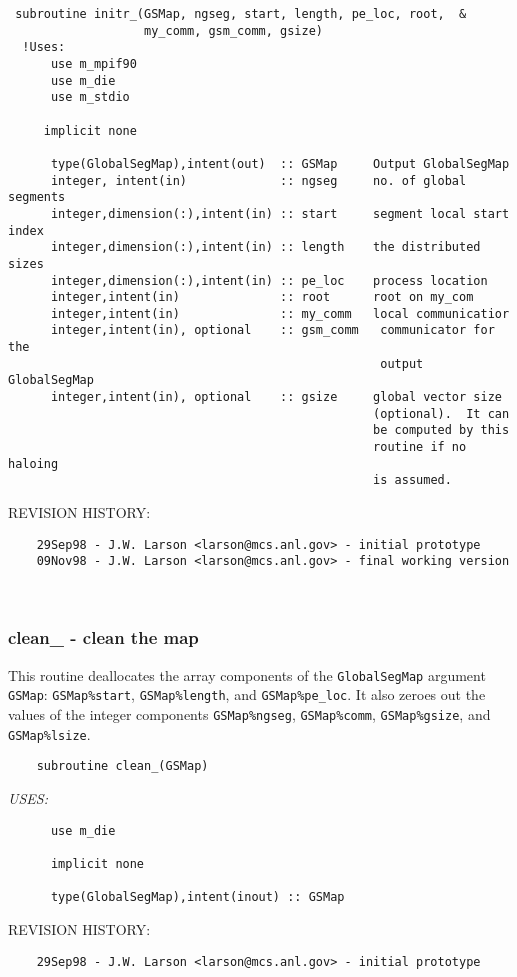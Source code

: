  
 
\begin{verbatim} 
 subroutine initr_(GSMap, ngseg, start, length, pe_loc, root,  &
                   my_comm, gsm_comm, gsize)
  !Uses:
      use m_mpif90
      use m_die
      use m_stdio
 
     implicit none
 
      type(GlobalSegMap),intent(out)  :: GSMap     Output GlobalSegMap
      integer, intent(in)             :: ngseg     no. of global segments
      integer,dimension(:),intent(in) :: start     segment local start index 
      integer,dimension(:),intent(in) :: length    the distributed sizes
      integer,dimension(:),intent(in) :: pe_loc    process location
      integer,intent(in)              :: root      root on my_com
      integer,intent(in)              :: my_comm   local communicatior
      integer,intent(in), optional    :: gsm_comm   communicator for the
                                                    output GlobalSegMap
      integer,intent(in), optional    :: gsize     global vector size
                                                   (optional).  It can
                                                   be computed by this 
                                                   routine if no haloing
                                                   is assumed.\end{verbatim}{\sf REVISION HISTORY:}
\begin{verbatim}  	29Sep98 - J.W. Larson <larson@mcs.anl.gov> - initial prototype
  	09Nov98 - J.W. Larson <larson@mcs.anl.gov> - final working version\end{verbatim}
 
 
\mbox{}\hrulefill\ 
 

 \subsubsection{clean\_ - clean the map}


 
  This routine deallocates the array components of the {\tt GlobalSegMap}
  argument {\tt GSMap}: {\tt GSMap\%start}, {\tt GSMap\%length}, and
  {\tt GSMap\%pe\_loc}.  It also zeroes out the values of the integer
  components {\tt GSMap\%ngseg}, {\tt GSMap\%comm}, {\tt GSMap\%gsize},
  and {\tt GSMap\%lsize}.
 
\begin{verbatim} 
    subroutine clean_(GSMap)\end{verbatim}{\em USES:}
\begin{verbatim}      use m_die
 
      implicit none
 
      type(GlobalSegMap),intent(inout) :: GSMap
 \end{verbatim}{\sf REVISION HISTORY:}
\begin{verbatim}  	29Sep98 - J.W. Larson <larson@mcs.anl.gov> - initial prototype\end{verbatim}
 
